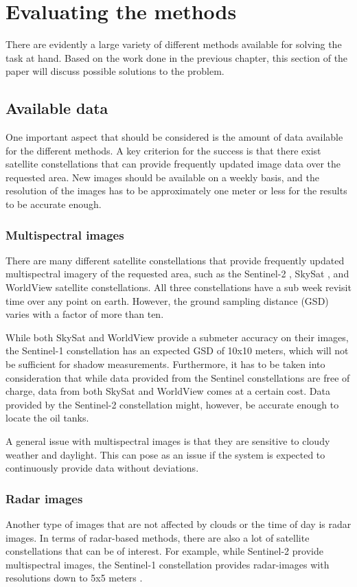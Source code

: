 \chapter{Evaluating the methods}
There are evidently a large variety of different methods available for solving the task at hand. Based on the work done in the previous chapter, this section of the paper will discuss possible solutions to the problem. 

\section{Available data}
One important aspect that should be considered is the amount of data available for the different methods. A key criterion for the success is that there exist satellite constellations that can provide frequently updated image data over the requested area. New images should be available on a weekly basis, and the resolution of the images has to be approximately one meter or less for the results to be accurate enough.

\subsection*{Multispectral images}
There are many different satellite constellations that provide frequently updated multispectral imagery of the requested area, such as the Sentinel-2 \citep{ESA}, SkySat \citep{Planet2017}, and WorldView \citep{DigitalGlobe2017} satellite constellations. All three constellations have a sub week revisit time over any point on earth. However, the ground sampling distance (GSD) varies with a factor of more than ten.

While both SkySat and WorldView provide a submeter accuracy on their images, the Sentinel-1 constellation has an expected GSD of 10x10 meters, which will not be sufficient for shadow measurements. Furthermore, it has to be taken into consideration that while data provided from the Sentinel constellations are free of charge, data from both SkySat and WorldView comes at a certain cost. Data provided by the Sentinel-2 constellation might, however, be accurate enough to locate the oil tanks. 

A general issue with multispectral images is that they are sensitive to cloudy weather and daylight. This can pose as an issue if the system is expected to continuously provide data without deviations.

\subsection*{Radar images}
Another type of images that are not affected by clouds or the time of day is radar images. In terms of radar-based methods, there are also a lot of satellite constellations that can be of interest. For example, while Sentinel-2 provide multispectral images, the Sentinel-1 constellation provides radar-images with resolutions down to 5x5 meters \citep{ESA}.

